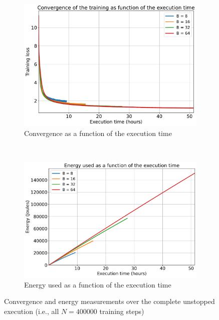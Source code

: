 \documentclass{article}
\begin{document}
{\begin{figure}[!t]
\begin{subfigure}[b]{0.47 \textwidth}
                \label{fig:convergence_energy_training}
            \end{subfigure}
            ~
            \begin{subfigure}[b]{0.47 \textwidth}
                \vspace{1.0em}
                \includegraphics[trim = {0.0in 0.0in 0.0in 0.0in}, clip, width = 1.0 \textwidth]{../Figures/time_vs_accuracy_training.pdf}
                \caption{Convergence as a function of the execution time}
                \label{fig:time_vs_accuracy_training}
            \end{subfigure}
            ~
            \begin{subfigure}[b]{0.47 \textwidth}
                \includegraphics[trim = {0.0in 0.01in 0.0in 0.0in}, clip, width = 1.060 \textwidth]{../Figures/time_vs_energy_training.pdf}
                \caption{Energy used as a function of the execution time}
                \label{fig:time_vs_energy_training}
            \end{subfigure}
            \caption{Convergence and energy measurements over the complete unstopped execution (i.e., all $N = 400000$ training steps)}
            \label{fig:unstopped_execution_training}
        \end{figure}

}
\end{document}

